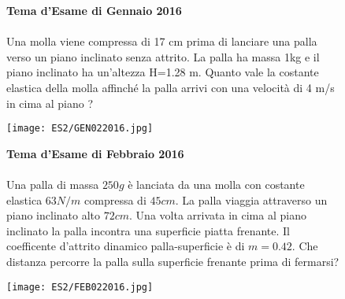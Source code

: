 
\begin{figure}[h!]
    \textbf{Tema d'Esame di Gennaio 2016}\\ \\
    Una molla viene compressa di 17 cm prima di lanciare una palla verso un piano inclinato
    senza attrito. La palla ha massa 1kg e il piano inclinato ha un'altezza H=1.28 m. Quanto vale
    la costante elastica della molla affinché la palla arrivi con una velocità di 4 m/s in cima al
    piano ?
    \\
        \begin{center}
            \texttt{[image: ES2/GEN022016.jpg]}
        \end{center}
    \end{figure}
    
    \begin{figure}[h!]
    \textbf{Tema d'Esame di Febbraio 2016}\\ \\
    Una palla di massa $250g$ è lanciata da una molla con costante elastica $63 N/m$ compressa di $45 cm$. La palla viaggia attraverso un piano inclinato alto $72 cm$. Una volta arrivata in cima al piano inclinato la palla incontra una superficie piatta frenante. Il coefficente d'attrito dinamico palla-superficie è di $m=0.42$. Che distanza percorre la palla sulla superficie frenante prima di fermarsi?
    \\
        \begin{center}
            \texttt{[image: ES2/FEB022016.jpg]}
        \end{center}
        \noindent{}
\end{figure}
